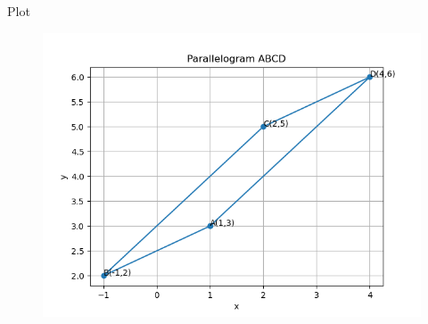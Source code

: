\documentclass{beamer}
\begin{document}
\begin{frame}{Plot}
    \begin{figure}[h!]
    \centering
    \includegraphics[height=0.6\textheight, keepaspectratio]{figs/plotc.png}
    \label{figure_1}
    \end{figure}
\end{frame}
\end{document}
